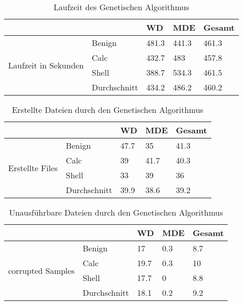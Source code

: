 \begin{table}[]
\begin{tabular}{@{}lllll@{}}
\toprule
                                      &              & WD & MDE & Gesamt \\ \midrule
\multirow{4}{*}{Laufzeit in Sekunden} & Benign       & 481.3                         & 441.3                                      & 461.3               \\
                                      & Calc         & 432.7                         & 483                                        & 457.8               \\
                                      & Shell        & 388.7                         & 534.3                                      & 461.5               \\
                                      & Durchschnitt & 434.2                         & 486.2                                      & 460.2               \\ \cmidrule(l){2-5} 
\end{tabular}
\caption{Laufzeit des Genetischen Algorithmus}

\label{tab:runtime}
\end{table}

\begin{table}[]
\begin{tabular}{@{}lllll@{}}
\toprule
                                 &              & WD   & MDE  & Gesamt \\ \midrule
\multirow{4}{*}{Erstellte Files} & Benign       & 47.7 & 35   & 41.3   \\
                                 & Calc         & 39   & 41.7 & 40.3   \\
                                 & Shell        & 33   & 39   & 36     \\
                                 & Durchschnitt & 39.9 & 38.6 & 39.2   \\ \cmidrule(l){2-5} 
\end{tabular}
\caption{Erstellte Dateien durch den Genetischen Algorithmus}
\label{tab:created_files}
\end{table}

\begin{table}[]
\begin{tabular}{@{}lllll@{}}
\toprule
                                   &              & WD   & MDE & Gesamt \\ \midrule
\multirow{4}{*}{corrupted Samples} & Benign       & 17   & 0.3 & 8.7    \\
                                   & Calc         & 19.7 & 0.3 & 10     \\
                                   & Shell        & 17.7 & 0   & 8.8    \\
                                   & Durchschnitt & 18.1 & 0.2 & 9.2    \\ \cmidrule(l){2-5} 
\end{tabular}
\caption{Unausführbare Dateien durch den Genetischen Algorithmus}
\label{tab:corrupted_files}
\end{table}

